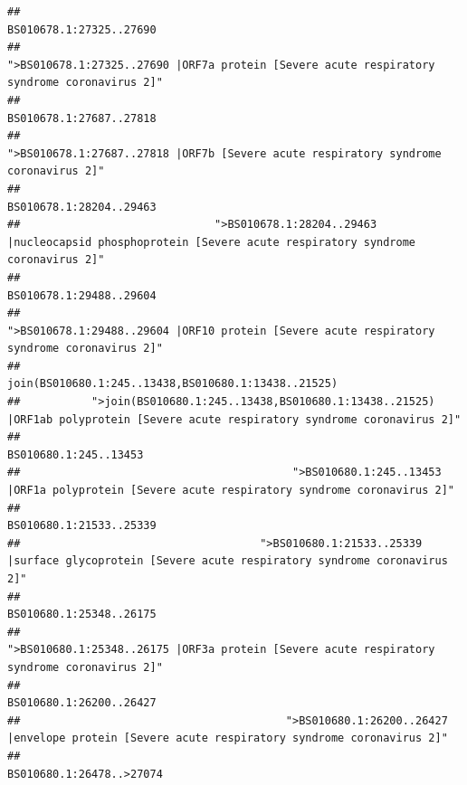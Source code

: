 \documentclass[
]{article}
\begin{document}
\begin{verbatim}
##                                                                                                                BS010678.1:27325..27690 
##                                            ">BS010678.1:27325..27690 |ORF7a protein [Severe acute respiratory syndrome coronavirus 2]" 
##                                                                                                                BS010678.1:27687..27818 
##                                                    ">BS010678.1:27687..27818 |ORF7b [Severe acute respiratory syndrome coronavirus 2]" 
##                                                                                                                BS010678.1:28204..29463 
##                              ">BS010678.1:28204..29463 |nucleocapsid phosphoprotein [Severe acute respiratory syndrome coronavirus 2]" 
##                                                                                                                BS010678.1:29488..29604 
##                                            ">BS010678.1:29488..29604 |ORF10 protein [Severe acute respiratory syndrome coronavirus 2]" 
##                                                                                    join(BS010680.1:245..13438,BS010680.1:13438..21525) 
##           ">join(BS010680.1:245..13438,BS010680.1:13438..21525) |ORF1ab polyprotein [Severe acute respiratory syndrome coronavirus 2]" 
##                                                                                                                  BS010680.1:245..13453 
##                                          ">BS010680.1:245..13453 |ORF1a polyprotein [Severe acute respiratory syndrome coronavirus 2]" 
##                                                                                                                BS010680.1:21533..25339 
##                                     ">BS010680.1:21533..25339 |surface glycoprotein [Severe acute respiratory syndrome coronavirus 2]" 
##                                                                                                                BS010680.1:25348..26175 
##                                            ">BS010680.1:25348..26175 |ORF3a protein [Severe acute respiratory syndrome coronavirus 2]" 
##                                                                                                                BS010680.1:26200..26427 
##                                         ">BS010680.1:26200..26427 |envelope protein [Severe acute respiratory syndrome coronavirus 2]" 
##                                                                                                               BS010680.1:26478..>27074 

\end{verbatim}
\end{document}
